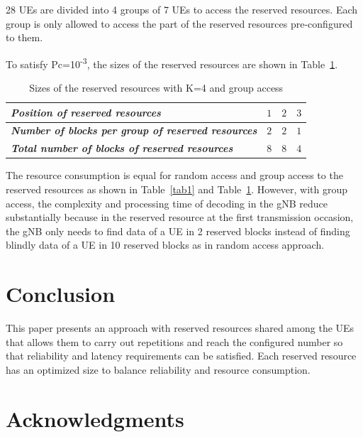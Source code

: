 \documentclass[conference]{IEEEtran}
\begin{document}
28 UEs are divided into 4 groups of 7 UEs to access the reserved resources. Each group is only allowed to access the part of the reserved resources pre-configured to them. 

To satisfy Pc=10\textsuperscript{-3}, the sizes of the reserved resources are shown in Table~\ref{tab3}.

\begin{table}[htbp]
\caption{Sizes of the reserved resources with K=4 and group access}
\begin{center}
\begin{tabular}{|p{14em}|p{2em}|p{2em}|p{2em}|}
 \hline
 \textbf{\textit{Position of reserved resources}} & $1$ &$2$ &$3$ \\ 
 \hline
 \textbf{\textit{Number of blocks per group of reserved resources}} & $2$ &$2$ &$1$ \\
 \hline
\textbf{\textit{Total number of blocks of reserved resources}} & $8$ &$8$ &$4$ \\
 
 \hline
\end{tabular}
\label{tab3}
\end{center}
\vspace{-6mm}
\end{table}

The resource consumption is equal for random access and group access to the reserved resources as shown in Table~\ref{tab1} and Table~\ref{tab3}. However, with group access, the complexity and processing time of decoding in the gNB reduce substantially because in the reserved resource at the first transmission occasion, the gNB only needs to find data of a UE in 2 reserved blocks instead of finding blindly data of a UE in 10 reserved blocks as in random access approach.

\section{Conclusion}\label{IV}

This paper presents an approach with reserved resources shared among the UEs that allows them to carry out repetitions and reach the configured number so that reliability and latency requirements can be  satisfied. Each reserved resource has an optimized size to balance reliability and  resource consumption. 

\section*{Acknowledgments}
\end{document}
